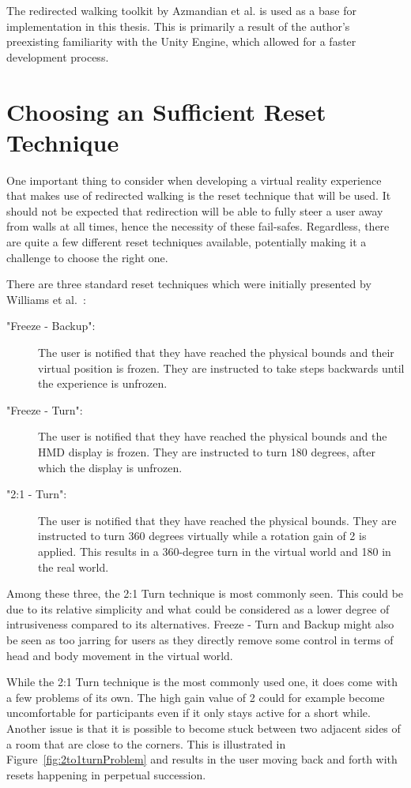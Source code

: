 The redirected walking toolkit by Azmandian et al. is used as a base for implementation in this thesis. This is primarily a result of the author's preexisting familiarity with the Unity Engine, which allowed for a faster development process.

\section{Choosing an Sufficient Reset Technique}\label{sec:choosingTheRightReset}
One important thing to consider when developing a virtual reality experience that makes use of redirected walking is the reset technique that will be used. It should not be expected that redirection will be able to fully steer a user away from walls at all times, hence the necessity of these fail-safes. Regardless, there are quite a few different reset techniques available, potentially making it a challenge to choose the right one. 

There are three standard reset techniques which were initially presented by Williams et al.~\cite{williams2007exploring}:
\begin{description}
    \item["Freeze - Backup": ] The user is notified that they have reached the physical bounds and their virtual position is frozen. They are instructed to take steps backwards until the experience is unfrozen. 
    \item["Freeze - Turn": ] The user is notified that they have reached the physical bounds and the HMD display is frozen. They are instructed to turn 180 degrees, after which the display is unfrozen. 
    \item["2:1 - Turn": ] The user is notified that they have reached the physical bounds. They are instructed to turn 360 degrees virtually while a rotation gain of 2 is applied. This results in a 360-degree turn in the virtual world and 180 in the real world.
\end{description}

Among these three, the 2:1 Turn technique is most commonly seen. This could be due to its relative simplicity and what could be considered as a lower degree of intrusiveness compared to its alternatives. Freeze - Turn and Backup might also be seen as too jarring for users as they directly remove some control in terms of head and body movement in the virtual world.

While the 2:1 Turn technique is the most commonly used one, it does come with a few problems of its own. The high gain value of 2 could for example become uncomfortable for participants even if it only stays active for a short while. Another issue is that it is possible to become stuck between two adjacent sides of a room that are close to the corners. This is illustrated in Figure~\ref{fig:2to1turnProblem} and results in the user moving back and forth with resets happening in perpetual succession.  

